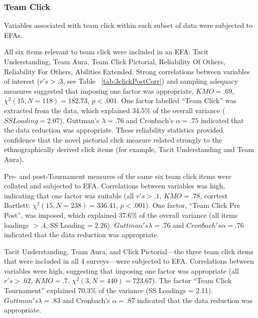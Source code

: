 \begin{CJK}{UTF8}{gbsn}
\subsubsection{Team Click}
Variables associated with team click within each subset of data were subjected to EFAs.

All six items relevant to team click were included in an EFA: Tacit Understanding, Team Aura, Team Click Pictorial, Reliability Of Others, Reliability For Others, Abilities Extended.  Strong correlations between variables of interest ($r's > .3$, see Table ~\ref{tab:3clickPostCorr}) and sampling adequacy measures suggested that imposing one factor was appropriate, $KMO =  .69$, $\chi^2(15, N = 118) = 182.73$, $p < .001$.  One factor labelled ``Team Click'' was extracted from the data, which explained 34.5\% of the overall variance ($SS Loading = 2.07$).  Guttman's $\lambda =.76$ and Cronbach's $\alpha = .75$ indicated that the data reduction was appropriate.  These reliability statistics provided confidence that the novel pictorial click measure related strongly to the ethnographically derived click items (for example, Tacit Understanding and Team Aura).

Pre- and post-Tournament measures of the same six team click items were collated and subjected to EFA. Correlations between variables was high, indicating that one factor was suitable (all $r's > .1$, $KMO = .78$, corrtest Bartlett: $\chi^2(15, N = 238) = 336.41$, $p < .001$).  One factor, ``Team Click Pre Post'', was imposed, which explained 37.6\% of the overall variance (all items loadings $> .4$, SS Loading = 2.26).  $Guttman's \lambda =.76$ and $Cronbach's \alpha = .76$ indicated that the data reduction was appropriate.

Tacit Understanding, Team Aura, and Click Pictorial---the three team click items that were included in all 4 surveys---were subjected to EFA.  Correlations between variables were high, suggesting that imposing one factor was appropriate (all $r's > .62$, $KMO = .7$, $\chi^2(3, N = 440) = 723.67$).  The factor ``Team Click Tournament'' explained 70.3\% of the variance (SS Loadings = 2.11).  $Guttman's \lambda =.83$ and Cronbach's $\alpha = .87$ indicated that the data reduction was appropriate.



\end{CJK}
